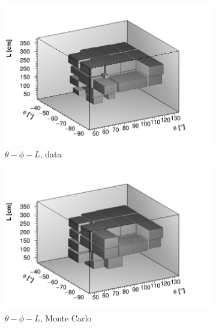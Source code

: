 \documentclass[a4paper]{scrartcl}
\begin{document}
\begin{figure}[htbp]
  \begin{center}
    \begin{subfigure}{0.52\textwidth}
      \includegraphics[width=\linewidth]{figures/theta_phi_l_data.png}
      \caption{$\theta - \phi - L$, data} \label{fig:3d_cry}
    \end{subfigure}\begin{subfigure}{0.52\textwidth}
    \includegraphics[width=\linewidth]{figures/theta_phi_l_mc.png}
    \caption{$\theta - \phi - L$, Monte Carlo}\label{fig:3d_cry_mc}
  \end{subfigure}
  \begin{subfigure}{0.52\textwidth}

\end{subfigure}
\end{center}
\end{figure}
\end{document}
